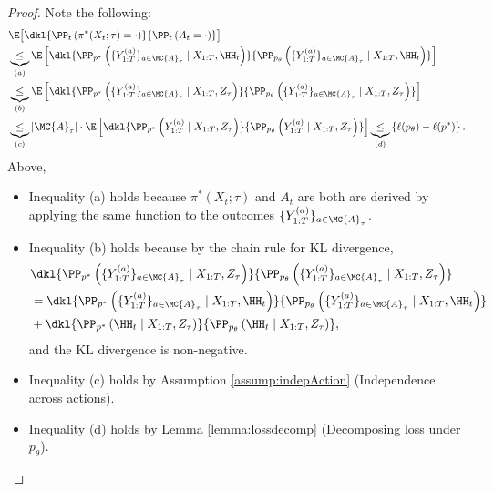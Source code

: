\begin{proof}
Note the following:
\begin{align*}
    &\E \big[ \dkl{\PP_t \left(\pi^*(X_t; \tau) = \cdot \right)}{\PP_t \left(A_t = \cdot \right)} \big] \\
    &\underbrace{\leq}_{(a)} \E \left[
    \dkl{\PP_{p^*} \left(\{Y_{1:T}^{(a)}\}_{a \in \MC{A}_{\tau}} \mid X_{1:T}, \HH_t \right)}{\PP_{p_{\theta}}\left( \{Y_{1:T}^{(a)}\}_{a \in \MC{A}_{\tau}} \mid X_{1:T}, \HH_t \right)} \right] \\
    &\underbrace{\leq}_{(b)} \E \left[
    \dkl{\PP_{p^*} \left(\{Y_{1:T}^{(a)}\}_{a \in \MC{A}_{\tau}} \mid X_{1:T}, Z_{\tau} \right)}{\PP_{p_{\theta}}\left( \{Y_{1:T}^{(a)}\}_{a \in \MC{A}_{\tau}} \mid X_{1:T}, Z_{\tau} \right)} \right] \\
    &\underbrace{\leq}_{(c)} |\MC{A}_{\tau}| \cdot \E \left[
    \dkl{\PP_{p^*} \left( Y_{1:T}^{(a)} \mid X_{1:T}, Z_{\tau} \right)}{\PP_{p_{\theta}}\left( Y_{1:T}^{(a)} \mid X_{1:T}, Z_{\tau} \right)} \right] 
    \underbrace{\leq}_{(d)} \left\{ \ell(p_{\theta}) - \ell(p^*) \right\}.
\end{align*}
Above,
\begin{itemize}
    \item Inequality (a) holds because $\pi^*(X_t; \tau)$ and $A_t$ are both are derived by applying the same function to the outcomes $\{Y_{1:T}^{(a)}\}_{a \in \MC{A}_{\tau}}$.
    \item Inequality (b) holds because by the chain rule for KL divergence, 
    \begin{align*}
        &\dkl{\PP_{p^*} \left(\{Y_{1:T}^{(a)}\}_{a \in \MC{A}_{\tau}} \mid X_{1:T}, Z_{\tau} \right)}{\PP_{p_{\theta}}\left( \{Y_{1:T}^{(a)}\}_{a \in \MC{A}_{\tau}} \mid X_{1:T}, Z_{\tau} \right)} \\
        &= \dkl{\PP_{p^*} \left(\{Y_{1:T}^{(a)}\}_{a \in \MC{A}_{\tau}} \mid X_{1:T}, \HH_t \right)}{\PP_{p_{\theta}}\left( \{Y_{1:T}^{(a)}\}_{a \in \MC{A}_{\tau}} \mid X_{1:T}, \HH_t \right)} \\
        &+ \dkl{\PP_{p^*} \left( \HH_t \mid X_{1:T}, Z_{\tau} \right)}{\PP_{p_{\theta}}\left( \HH_t \mid X_{1:T}, Z_{\tau} \right)},
    \end{align*}
    and the KL divergence is non-negative.
    \item Inequality (c) holds by Assumption \ref{assump:indepAction} (Independence across actions).
    \item Inequality (d) holds by Lemma \ref{lemma:lossdecomp} (Decomposing loss under $p_\theta$).
\end{itemize}
\end{proof}


